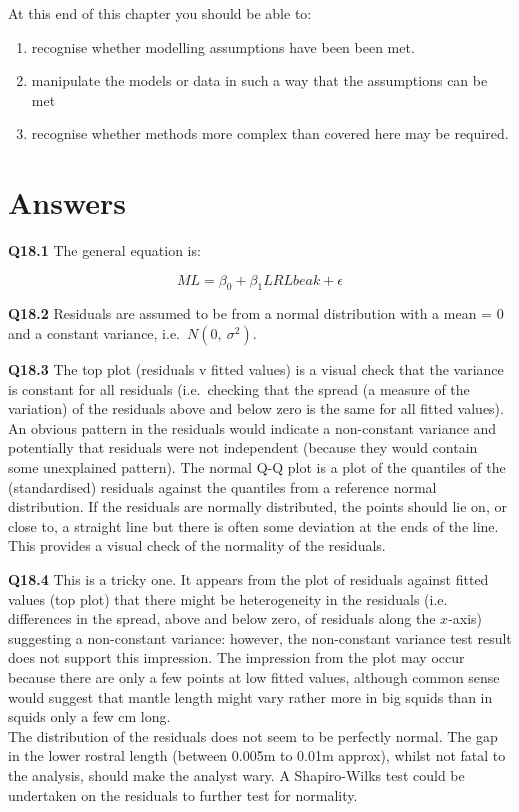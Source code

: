 \documentclass[
  oneside]{krantz}
\providecommand{\tightlist}{%
  \setlength{\itemsep}{0pt}\setlength{\parskip}{0pt}}
\begin{document}
At this end of this chapter you should be able to:

\begin{enumerate}
\def\labelenumi{\arabic{enumi}.}
\tightlist
\item
  recognise whether modelling assumptions have been been met.
\item
  manipulate the models or data in such a way that the assumptions can be met
\item
  recognise whether methods more complex than covered here may be required.
\end{enumerate}

\hypertarget{ANSdiag}{%
\section{Answers}\label{ANSdiag}}

\textbf{Q18.1} The general equation is:

\[ML= \beta_0+\beta_1LRLbeak+ \epsilon\]

\textbf{Q18.2} Residuals are assumed to be from a normal distribution with a mean = 0 and a constant variance, i.e.~\(N(0,\ {\sigma{}}^2)\).

\textbf{Q18.3} The top plot (residuals v fitted values) is a visual check that the variance is
constant for all residuals (i.e.~checking that the spread (a measure of the
variation) of the residuals above and below zero is the same for all fitted
values). An obvious pattern in the residuals would indicate a non-constant
variance and potentially that residuals were not independent (because they would
contain some unexplained pattern).
The normal Q-Q plot is a plot of the quantiles of the (standardised) residuals
against the quantiles from a reference normal distribution. If the residuals are
normally distributed, the points should lie on, or close to, a straight line but
there is often some deviation at the ends of the line. This provides a visual
check of the normality of the residuals.

\textbf{Q18.4} This is a tricky one. It appears from the plot of residuals against fitted
values (top plot) that there might be heterogeneity in the residuals (i.e.
differences in the spread, above and below zero, of residuals along the
\(x\)-axis) suggesting a non-constant variance: however, the non-constant
variance test result does not support this impression. The impression from the
plot may occur because there are only a few points at low fitted values, although
common sense would suggest that mantle length might vary rather more in big
squids than in squids only a few cm long.\\
The distribution of the residuals does not seem to be perfectly normal. The gap
in the lower rostral length (between 0.005m to 0.01m approx), whilst not fatal to
the analysis, should make the analyst wary. A Shapiro-Wilks test could be
undertaken on the residuals to further test for normality.
\end{document}

